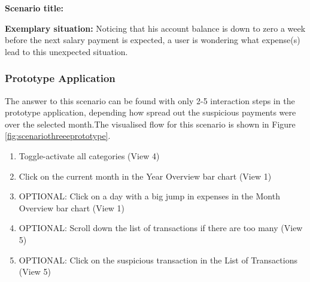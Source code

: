 \textbf{Scenario title:} \scenthree

\textbf{Exemplary situation:} Noticing that his account balance is down to zero a week before the next salary payment is expected, a user is wondering what expense(s) lead to this unexpected situation.



\subsubsection{Prototype Application}

The answer to this scenario can be found with only 2-5 interaction steps in the prototype application, depending how spread out the suspicious payments were over the selected month.The visualised flow for this scenario is shown in Figure \ref{fig:scenariothreeeprototype}.
\begin{enumerate}
	\item Toggle-activate all categories (View 4)
	\item Click on the current month in the Year Overview bar chart (View 1)
	\item OPTIONAL: Click on a day with a big jump in expenses in the Month Overview bar chart (View 1)
	\item OPTIONAL: Scroll down the list of transactions if there are too many (View 5)
	\item OPTIONAL: Click on the suspicious transaction in the List of Transactions (View 5)
\end{enumerate}
